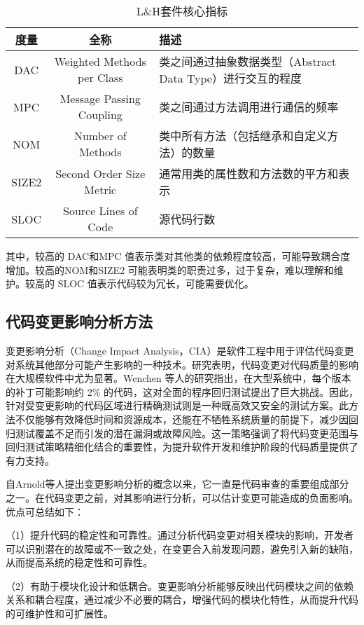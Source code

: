 \begin{table}[htbp]
\caption{L\&H套件核心指标}
\vspace{0.5em}\centering\wuhao
\begin{tabular}{ccp{8cm}}
\toprule
度量 & 全称 & 描述 \\
\midrule
DAC & Weighted Methods per Class & 类之间通过抽象数据类型（Abstract Data Type）进行交互的程度 \\
MPC & Message Passing Coupling & 类之间通过方法调用进行通信的频率 \\
NOM & Number of Methods & 类中所有方法（包括继承和自定义方法）的数量 \\
SIZE2 & Second Order Size Metric & 通常用类的属性数和方法数的平方和表示  \\
SLOC & Source Lines of Code & 源代码行数  \\
\bottomrule
\end{tabular}
\end{table}

其中，较高的 DAC和MPC 值表示类对其他类的依赖程度较高，可能导致耦合度增加。较高的NOM和SIZE2 可能表明类的职责过多，过于复杂，难以理解和维护。较高的 SLOC 值表示代码较为冗长，可能需要优化。


\subsection{代码变更影响分析方法}

变更影响分析（Change Impact Analysis，CIA）是软件工程中用于评估代码变更对系统其他部分可能产生影响的一种技术。研究表明，代码变更对代码质量的影响在大规模软件中尤为显著。Wenchen 等人的研究指出\cite{2013Large}，在大型系统中，每个版本的补丁可能影响约 2\% 的代码，这对全面的程序回归测试提出了巨大挑战。因此，针对受变更影响的代码区域进行精确测试则是一种既高效又安全的测试方案。此方法不仅能够有效降低时间和资源成本，还能在不牺牲系统质量的前提下，减少因回归测试覆盖不足而引发的潜在漏洞或故障风险。这一策略强调了将代码变更范围与回归测试策略精细化结合的重要性，为提升软件开发和维护阶段的代码质量提供了有力支持。

自Arnold等人\cite{Arnold1996}提出变更影响分析的概念以来，它一直是代码审查的重要组成部分之一。在代码变更之前，对其影响进行分析，可以估计变更可能造成的负面影响。优点可总结如下：

（1）提升代码的稳定性和可靠性。通过分析代码变更对相关模块的影响，开发者可以识别潜在的故障或不一致之处，在变更合入前发现问题，避免引入新的缺陷，从而提高系统的稳定性和可靠性。

（2）有助于模块化设计和低耦合。变更影响分析能够反映出代码模块之间的依赖关系和耦合程度，通过减少不必要的耦合，增强代码的模块化特性，从而提升代码的可维护性和可扩展性。

